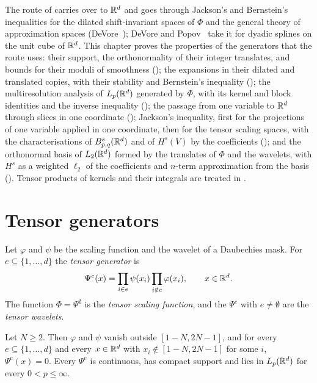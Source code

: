 The route of  carries over to $\mathbb{R}^d$ and goes through Jackson's and
Bernstein's inequalities for the dilated shift-invariant spaces of $\Phi$ and the general theory
of approximation spaces (DeVore~\cite[\S 4.3, Theorem~1, and \S 7.1]{DeVore1998}); DeVore and
Popov~\cite[Theorems~4.5 and~5.1]{DeVorePopovTAMS} take it for dyadic splines on the unit cube
of $\mathbb{R}^d$. This chapter proves the properties of the generators that the route uses: their
support, the orthonormality of their integer translates, and bounds for their moduli of
smoothness (); the expansions in their dilated and translated
copies, with their stability and Bernstein's inequality (); the
multiresolution analysis of $L_p(\mathbb{R}^d)$ generated by $\Phi$, with its kernel and block
identities and the inverse inequality (); the passage from one variable to
$\mathbb{R}^d$ through slices in one coordinate (); Jackson's inequality, first
for the projections of one variable applied in one coordinate, then for the tensor scaling
spaces, with the characterisations of $B^{s}_{p,q}(\mathbb{R}^d)$ and of $H^s(V)$ by the coefficients
(); and the orthonormal basis of $L_2(\mathbb{R}^d)$ formed by the translates of
$\Phi$ and the wavelets, with $H^s$ as a weighted $\ell_2$ of the coefficients and $n$-term
approximation from the basis (). Tensor products of kernels and their
integrals are treated in .

\section{Tensor generators}
\label{sec:daub-rd-generators}

\begin{definition}
\label{def:daub-rd-generators}
\leanok
{}
Let $\varphi$ and $\psi$ be the scaling function and the wavelet of a Daubechies mask. For
$e \subseteq \{1, \dots, d\}$ the \emph{tensor generator} is
\[
  \Psi^e(x) = \prod_{i \in e} \psi(x_i) \prod_{i \notin e} \varphi(x_i) ,
  \qquad x \in \mathbb{R}^d .
\]
The function $\Phi = \Psi^\emptyset$ is the \emph{tensor scaling function}, and the $\Psi^e$
with $e \neq \emptyset$ are the \emph{tensor wavelets}.
\end{definition}

\begin{lemma}
\label{lem:daub-rd-generator-support}
\leanok
{}
Let $N \geq 2$. Then $\varphi$ and $\psi$ vanish outside $[1 - N, 2N - 1]$, and for every
$e \subseteq \{1, \dots, d\}$ and every $x \in \mathbb{R}^d$ with $x_i \notin [1 - N, 2N - 1]$ for some
$i$, $\Psi^e(x) = 0$. Every $\Psi^e$ is continuous, has compact support and lies in
$L_p(\mathbb{R}^d)$ for every $0 < p \leq \infty$.
\end{lemma}


